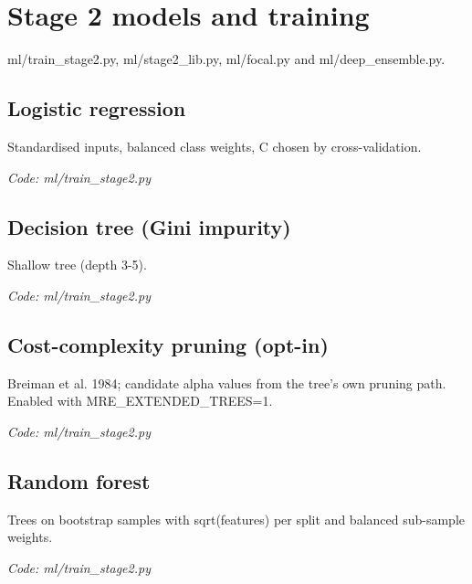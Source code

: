 \documentclass[11pt,a4paper]{article}
\newcommand{\where}[1]{\par{\small\itshape\color{mute}Code: #1}\par}
\begin{document}
\clearpage
\section{Stage 2 models and training}
{\color{mute}ml/train\_stage2.py, ml/stage2\_lib.py, ml/focal.py and ml/deep\_ensemble.py.}

\subsection*{Logistic regression}
\par\smallskip\noindent{}\par\smallskip
Standardised inputs, balanced class weights, C chosen by cross-validation.
\where{ml/train\_stage2.py}

\subsection*{Decision tree (Gini impurity)}
\par\smallskip\noindent{}\par\smallskip
Shallow tree (depth 3-5).
\where{ml/train\_stage2.py}

\subsection*{Cost-complexity pruning (opt-in)}
\par\smallskip\noindent{}\par\smallskip
Breiman et al. 1984; candidate alpha values from the tree's own pruning path. Enabled with MRE\_EXTENDED\_TREES=1.
\where{ml/train\_stage2.py}

\subsection*{Random forest}
\par\smallskip\noindent{}\par\smallskip
Trees on bootstrap samples with sqrt(features) per split and balanced sub-sample weights.
\where{ml/train\_stage2.py}
\end{document}
